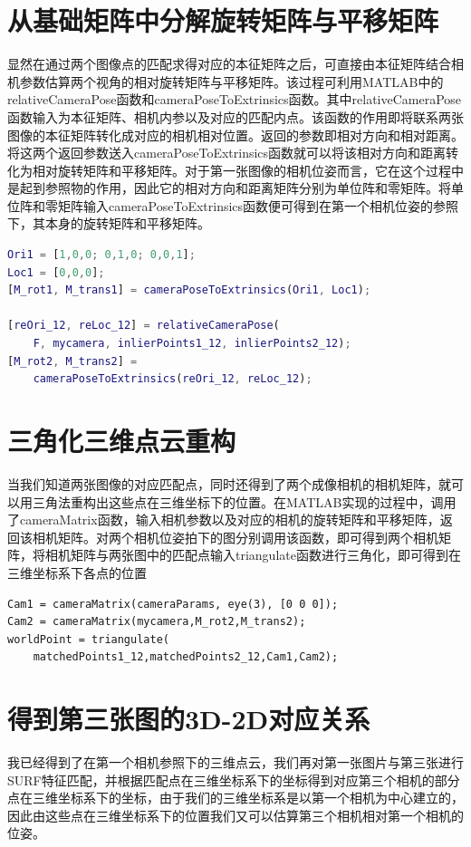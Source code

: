 \section{从基础矩阵中分解旋转矩阵与平移矩阵}
显然在通过两个图像点的匹配求得对应的本征矩阵之后，可直接由本征矩阵结合相机参数估算两个视角的相对旋转矩阵与平移矩阵。该过程可利用MATLAB中的relativeCameraPose函数和cameraPoseToExtrinsics函数。其中relativeCameraPose函数输入为本征矩阵、相机内参以及对应的匹配内点。该函数的作用即将联系两张图像的本征矩阵转化成对应的相机相对位置。返回的参数即相对方向和相对距离。将这两个返回参数送入cameraPoseToExtrinsics函数就可以将该相对方向和距离转化为相对旋转矩阵和平移矩阵。对于第一张图像的相机位姿而言，它在这个过程中是起到参照物的作用，因此它的相对方向和距离矩阵分别为单位阵和零矩阵。将单位阵和零矩阵输入cameraPoseToExtrinsics函数便可得到在第一个相机位姿的参照下，其本身的旋转矩阵和平移矩阵。

\begin{lstlisting}[language=matlab]
Ori1 = [1,0,0; 0,1,0; 0,0,1];
Loc1 = [0,0,0];
[M_rot1, M_trans1] = cameraPoseToExtrinsics(Ori1, Loc1);

[reOri_12, reLoc_12] = relativeCameraPose(
    F, mycamera, inlierPoints1_12, inlierPoints2_12);
[M_rot2, M_trans2] = 
    cameraPoseToExtrinsics(reOri_12, reLoc_12);
\end{lstlisting}

\section{三角化三维点云重构}
当我们知道两张图像的对应匹配点，同时还得到了两个成像相机的相机矩阵，就可以用三角法重构出这些点在三维坐标下的位置。在MATLAB实现的过程中，调用了cameraMatrix函数，输入相机参数以及对应的相机的旋转矩阵和平移矩阵，返回该相机矩阵。对两个相机位姿拍下的图分别调用该函数，即可得到两个相机矩阵，将相机矩阵与两张图中的匹配点输入triangulate函数进行三角化，即可得到在三维坐标系下各点的位置

\begin{lstlisting}
Cam1 = cameraMatrix(cameraParams, eye(3), [0 0 0]);
Cam2 = cameraMatrix(mycamera,M_rot2,M_trans2);
worldPoint = triangulate(
    matchedPoints1_12,matchedPoints2_12,Cam1,Cam2);
\end{lstlisting}

\section{得到第三张图的3D-2D对应关系}
我已经得到了在第一个相机参照下的三维点云，我们再对第一张图片与第三张进行SURF特征匹配，并根据匹配点在三维坐标系下的坐标得到对应第三个相机的部分点在三维坐标系下的坐标，由于我们的三维坐标系是以第一个相机为中心建立的，因此由这些点在三维坐标系下的位置我们又可以估算第三个相机相对第一个相机的位姿。

